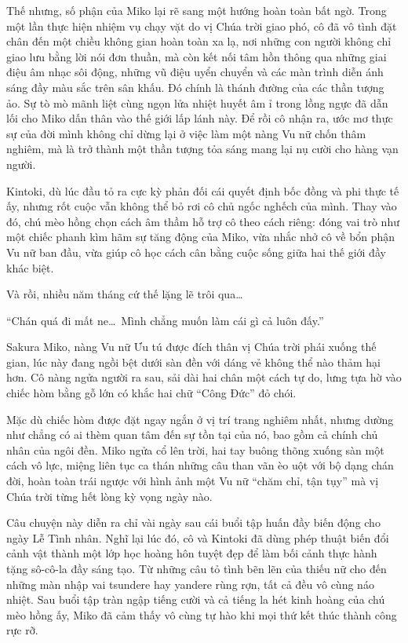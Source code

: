 \documentclass[../main.tex]{subfiles}
\begin{document}
Thế nhưng, số phận của Miko lại rẽ sang một hướng hoàn toàn bất ngờ. Trong một lần thực hiện nhiệm vụ chạy vặt do vị Chúa trời giao phó, cô đã vô tình đặt chân đến một chiều không gian hoàn toàn xa lạ, nơi những con người không chỉ giao lưu bằng lời nói đơn thuần, mà còn kết nối tâm hồn thông qua những giai điệu âm nhạc sôi động, những vũ điệu uyển chuyển và các màn trình diễn ánh sáng đầy màu sắc trên sân khấu. Đó chính là thánh đường của các thần tượng ảo. Sự tò mò mãnh liệt cùng ngọn lửa nhiệt huyết âm ỉ trong lồng ngực đã dẫn lối cho Miko dấn thân vào thế giới lấp lánh này. Để rồi cô nhận ra, ước mơ thực sự của đời mình không chỉ dừng lại ở việc làm một nàng Vu nữ chốn thâm nghiêm, mà là trở thành một thần tượng tỏa sáng mang lại nụ cười cho hàng vạn người.

Kintoki, dù lúc đầu tỏ ra cực kỳ phản đối cái quyết định bốc đồng và phi thực tế ấy, nhưng rốt cuộc vẫn không thể bỏ rơi cô chủ ngốc nghếch của mình. Thay vào đó, chú mèo hồng chọn cách âm thầm hỗ trợ cô theo cách riêng: đóng vai trò như một chiếc phanh kìm hãm sự tăng động của Miko, vừa nhắc nhở cô về bổn phận Vu nữ ban đầu, vừa giúp cô học cách cân bằng cuộc sống giữa hai thế giới đầy khác biệt.

Và rồi, nhiều năm tháng cứ thế lặng lẽ trôi qua\dots

\ct

``Chán quá đi mất ne\dots\ Mình chẳng muốn làm cái gì cả luôn đấy.''

Sakura Miko, nàng Vu nữ Ưu tú được đích thân vị Chúa trời phái xuống thế gian, lúc này đang ngồi bệt dưới sàn đền với dáng vẻ không thể nào thảm hại hơn. Cô nàng ngửa người ra sau, sải dài hai chân một cách tự do, lưng tựa hờ vào chiếc hòm bằng gỗ lớn có khắc hai chữ ``Công Đức'' đỏ chói.


Mặc dù chiếc hòm được đặt ngay ngắn ở vị trí trang nghiêm nhất, nhưng dường như chẳng có ai thèm quan tâm đến sự tồn tại của nó, bao gồm cả chính chủ nhân của ngôi đền. Miko ngửa cổ lên trời, hai tay buông thõng xuống sàn một cách vô lực, miệng liên tục ca thán những câu than vãn èo uột với bộ dạng chán đời, hoàn toàn trái ngược với hình ảnh một Vu nữ ``chăm chỉ, tận tụy'' mà vị Chúa trời từng hết lòng kỳ vọng ngày nào.

Câu chuyện này diễn ra chỉ vài ngày sau cái buổi tập huấn đầy biến động cho ngày Lễ Tình nhân. Nghĩ lại lúc đó, cô và Kintoki đã dùng phép thuật biến đổi cảnh vật thành một lớp học hoàng hôn tuyệt đẹp để làm bối cảnh thực hành tặng sô-cô-la đầy sáng tạo. Từ những câu tỏ tình bẽn lẽn của thiếu nữ cho đến những màn nhập vai tsundere hay yandere rùng rợn, tất cả đều vô cùng náo nhiệt. Sau buổi tập tràn ngập tiếng cười và cả tiếng la hét kinh hoàng của chú mèo hồng ấy, Miko đã cảm thấy vô cùng tự hào khi mọi thứ kết thúc thành công rực rỡ.
\end{document}
